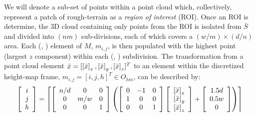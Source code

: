 			We will denote a sub-set of points within a point cloud which, collectively, represent a patch of rough-terrain as a \emph{region of interest} (ROI). Once an ROI is determine, the 3D cloud containing only points from the ROI is isolated from $\bar{S}$ and divided into $(nm)$ sub-divisions, each of which covers a $(w/m) \times (d/n)$ area. Each (\Ith, \Jth) element of $M$, $m_{i,j}$, is then populated with the highest point (largest  $z$ component) within each  (\Ith, \Jth) subdivision. The transformation from a point cloud element $\bar{x} = [\left[\bar{x}\right]_{x},\left[\bar{x}\right]_{y},\left[\bar{x}\right]_{z}]^{T}$ to an element within the discretized height-map frame, $m_{i,j} = [i,j,h]^{T} \in O_{hm}$, can be described by:
				\begin{equation}
					\left[
						\begin{array}{c}
						i \\
						j \\
						h  	\\
						\end{array}
					\right]
					=
					\left\lceil
						\left[
							\begin{array}{ccc}
							n/d & 0 	& 0 \\
							0 	& m/w 	& 0 \\
							0 	& 0 	& 1 \\
							\end{array}
						\right]
						\left(
							\left[
								\begin{array}{ccc}
								0 &-1 & 0 \\
								1 & 0 & 0 \\
								0 & 0 & 1 \\
								\end{array}
							\right]
							\left[
								\begin{array}{c}
								\left[\bar{x}\right]_{x} \\
								\left[\bar{x}\right]_{y} \\
								\left[\bar{x}\right]_{z} \\
								\end{array}
							\right]
							+
							\left[
								\begin{array}{c}
								1.5 d \\
								0.5 w \\
								0 \\
								\end{array}
							\right]
						\right)
					\right\rceil
					\label{eq::toheightmapframe}
				\end{equation}
